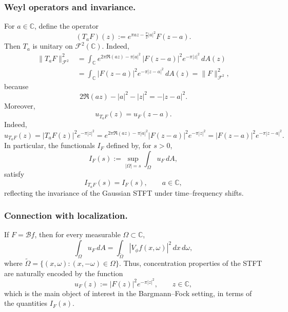 \documentclass[a4paper,11pt,reqno]{amsart}
\numberwithin{equation}{section}
\theoremstyle{plain} %
\theoremstyle{definition} %
\theoremstyle{remark}
\newcommand{\C}{\mathbb{C}}
\begin{document}
\medskip

\noindent
\subsubsection*{Weyl operators and invariance.}
For $a \in \mathbb{C}$, define the operator
\begin{equation}\label{eq:Ta}
(T_a F)(z) := e^{\pi a z - \frac{\pi}{2}|a|^2} F(z - a).
\end{equation}
Then $T_a$ is unitary on $\mathcal{F}^2(\mathbb{C})$. Indeed,
\begin{align*}
\|T_aF\|_{\mathcal F^2}^2
&=
\int_{\C} e^{2\pi \Re(az)-\pi |a|^2}\,|F(z-a)|^2 e^{-\pi |z|^2}\,dA(z) \\
&=
\int_{\C} |F(z-a)|^2 e^{-\pi |z-a|^2}\,dA(z)
=
\|F\|_{\mathcal F^2}^2,
\end{align*}
because
\[
2\Re(az)-|a|^2-|z|^2=-|z-a|^2.
\]
Moreover,
\begin{equation}\label{eq:uF-translate}
u_{T_a F}(z) = u_F(z - a).
\end{equation}
Indeed,
\[
u_{T_aF}(z)
=
|T_aF(z)|^2e^{-\pi |z|^2}
=
e^{2\pi\Re(az)-\pi|a|^2}|F(z-a)|^2e^{-\pi |z|^2}
=
|F(z-a)|^2e^{-\pi |z-a|^2}.
\]
In particular, the functionals $I_F$ defined by, 
for \(s>0\),
\[
I_F(s):=\sup_{|\Omega|=s}\int_\Omega u_F\,dA,
\]
satisfy
\begin{equation}\label{eq:I-translation-global}
I_{T_a F}(s) = I_F(s), \qquad a \in \mathbb{C},
\end{equation}
reflecting the invariance of the Gaussian STFT under time--frequency shifts.

\medskip

\noindent
\subsubsection*{Connection with localization.}
If $F = \mathcal{B}f$, then for every measurable $\Omega \subset \mathbb{C}$,
\[
\int_\Omega u_F \, dA
= \int_{\widetilde{\Omega}} |V_\phi f(x,\omega)|^2 \, dx\, d\omega,
\]
where $\widetilde{\Omega} = \{(x,\omega) : (x,-\omega) \in \Omega\}$.
Thus, concentration properties of the STFT are naturally encoded by the function
\begin{equation}\label{eq:uF}
u_F(z) := |F(z)|^2 e^{-\pi |z|^2}, \qquad z \in \mathbb{C},
\end{equation}
which is the main object of interest in the Bargmann--Fock setting, in terms of the
quantities $I_F(s)$.

\medskip
\end{document}
